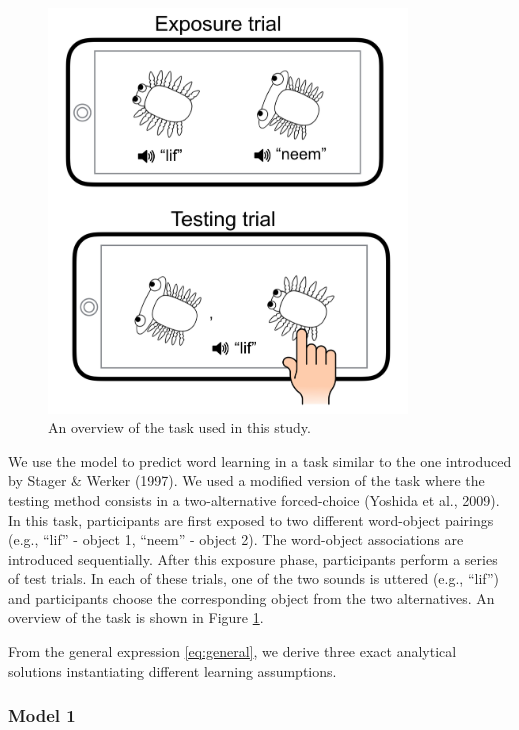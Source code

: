 \documentclass[english,,man]{apa6}
\begin{document}
\begin{figure}[t]

{\centering \includegraphics[width=3.75in]{figs/task} 

}

\caption{An overview of the task used in this study.}\label{fig:task}
\end{figure}

We use the model to predict word learning in a task similar to the one introduced by Stager \& Werker (1997). We used a modified version of the task where the testing method consists in a two-alternative forced-choice (Yoshida et al., 2009). In this task, participants are first exposed to two different word-object pairings (e.g., \enquote{lif} - object 1, \enquote{neem} - object 2). The word-object associations are introduced sequentially. After this exposure phase, participants perform a series of test trials. In each of these trials, one of the two sounds is uttered (e.g., \enquote{lif}) and participants choose the corresponding object from the two alternatives. An overview of the task is shown in Figure \ref{fig:task}.

From the general expression \ref{eq:general}, we derive three exact analytical solutions instantiating different learning assumptions.

\hypertarget{model-1}{%
\subsubsection{Model 1}\label{model-1}}
\end{document}

